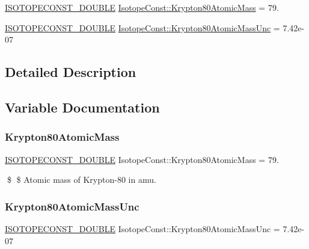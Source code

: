 \begin{DoxyCompactItemize}
\item 
\mbox{\hyperlink{group___isotope_const-_macros_ga8f45a7272ce02c0b4c65c44636ed719a}{I\+S\+O\+T\+O\+P\+E\+C\+O\+N\+S\+T\+\_\+\+D\+O\+U\+B\+LE}} \mbox{\hyperlink{group___isotope_const-_krypton-_kr80_ga605ccbde5b2a4f4805304d18bdbae106}{Isotope\+Const\+::\+Krypton80\+Atomic\+Mass}} = 79.
\item 
\mbox{\hyperlink{group___isotope_const-_macros_ga8f45a7272ce02c0b4c65c44636ed719a}{I\+S\+O\+T\+O\+P\+E\+C\+O\+N\+S\+T\+\_\+\+D\+O\+U\+B\+LE}} \mbox{\hyperlink{group___isotope_const-_krypton-_kr80_gaa2f79800d3911f279a42ad5ce76e02c8}{Isotope\+Const\+::\+Krypton80\+Atomic\+Mass\+Unc}} = 7.\+42e-\/07
\end{DoxyCompactItemize}


\subsection{Detailed Description}


\subsection{Variable Documentation}
\mbox{\label{group___isotope_const-_krypton-_kr80_ga605ccbde5b2a4f4805304d18bdbae106}} 
\subsubsection{\texorpdfstring{Krypton80\+Atomic\+Mass}{Krypton80AtomicMass}}
{\footnotesize\ttfamily \mbox{\hyperlink{group___isotope_const-_macros_ga8f45a7272ce02c0b4c65c44636ed719a}{I\+S\+O\+T\+O\+P\+E\+C\+O\+N\+S\+T\+\_\+\+D\+O\+U\+B\+LE}} Isotope\+Const\+::\+Krypton80\+Atomic\+Mass = 79.}

\$ \$ Atomic mass of Krypton-\/80 in amu. \mbox{\label{group___isotope_const-_krypton-_kr80_gaa2f79800d3911f279a42ad5ce76e02c8}} 
\subsubsection{\texorpdfstring{Krypton80\+Atomic\+Mass\+Unc}{Krypton80AtomicMassUnc}}
{\footnotesize\ttfamily \mbox{\hyperlink{group___isotope_const-_macros_ga8f45a7272ce02c0b4c65c44636ed719a}{I\+S\+O\+T\+O\+P\+E\+C\+O\+N\+S\+T\+\_\+\+D\+O\+U\+B\+LE}} Isotope\+Const\+::\+Krypton80\+Atomic\+Mass\+Unc = 7.\+42e-\/07}

